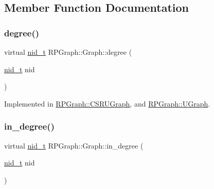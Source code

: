 \subsection{Member Function Documentation}
\mbox{\label{classRPGraph_1_1Graph_a8a95d1f403c3d9860cf7399abc820c7d}} 
\subsubsection{\texorpdfstring{degree()}{degree()}}
{\footnotesize\ttfamily virtual \mbox{\hyperlink{namespaceRPGraph_ab3ae34f1ab88e48f43794c30c8697b74}{nid\+\_\+t}} R\+P\+Graph\+::\+Graph\+::degree (\begin{DoxyParamCaption}\item[{\mbox{\hyperlink{namespaceRPGraph_ab3ae34f1ab88e48f43794c30c8697b74}{nid\+\_\+t}}}]{nid }\end{DoxyParamCaption})\hspace{0.3cm}{\ttfamily [pure virtual]}}



Implemented in \mbox{\hyperlink{classRPGraph_1_1CSRUGraph_ae2f3bb7a5ee2b53c88145a0cee6ed277}{R\+P\+Graph\+::\+C\+S\+R\+U\+Graph}}, and \mbox{\hyperlink{classRPGraph_1_1UGraph_a4d3c3af1ba4787ef5ced5f5efa9d05cf}{R\+P\+Graph\+::\+U\+Graph}}.

\mbox{\label{classRPGraph_1_1Graph_ab75e19f698a4ab99e37593c7178f2c1a}} 
\subsubsection{\texorpdfstring{in\+\_\+degree()}{in\_degree()}}
{\footnotesize\ttfamily virtual \mbox{\hyperlink{namespaceRPGraph_ab3ae34f1ab88e48f43794c30c8697b74}{nid\+\_\+t}} R\+P\+Graph\+::\+Graph\+::in\+\_\+degree (\begin{DoxyParamCaption}\item[{\mbox{\hyperlink{namespaceRPGraph_ab3ae34f1ab88e48f43794c30c8697b74}{nid\+\_\+t}}}]{nid }\end{DoxyParamCaption})\hspace{0.3cm}{\ttfamily [pure virtual]}}



